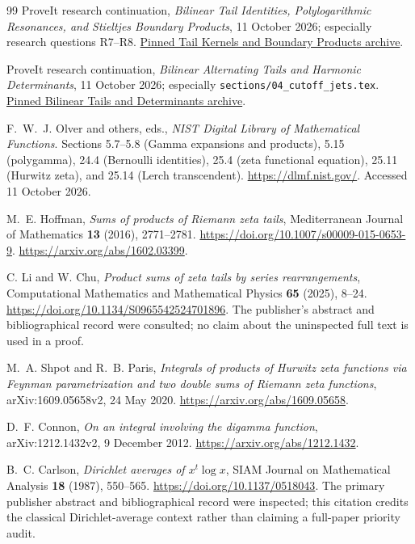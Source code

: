 \documentclass[11pt,letterpaper]{article}
\numberwithin{equation}{section}
\theoremstyle{definition}
\theoremstyle{remark}
\begin{document}
\begin{thebibliography}{99}
ProveIt research continuation,
\emph{Bilinear Tail Identities, Polylogarithmic Resonances,
and Stieltjes Boundary Products},
11 October 2026; especially research questions R7--R8.
\href{https://github.com/VladimirReshetnikov/ProveIt/blob/36edefa8c531d9d6df8306ac51bcc317250f404c/docs/incoming/ProveIt_Tail_Kernels_and_Boundary_Products_2026-10-11.zip}{Pinned Tail Kernels and Boundary Products archive}.

ProveIt research continuation,
\emph{Bilinear Alternating Tails and Harmonic Determinants},
11 October 2026; especially
\texttt{sections/04\_cutoff\_jets.tex}.
\href{https://github.com/VladimirReshetnikov/ProveIt/blob/36edefa8c531d9d6df8306ac51bcc317250f404c/docs/incoming/ProveIt_Bilinear_Tails_and_Determinants_2026-10-11.zip}{Pinned Bilinear Tails and Determinants archive}.

F.~W.~J. Olver and others, eds.,
\emph{NIST Digital Library of Mathematical Functions}.
Sections 5.7--5.8 (Gamma expansions and products), 5.15 (polygamma),
24.4 (Bernoulli identities), 25.4 (zeta functional equation),
25.11 (Hurwitz zeta), and 25.14 (Lerch transcendent).
\url{https://dlmf.nist.gov/}.
Accessed 11 October 2026.

M.~E. Hoffman,
\emph{Sums of products of Riemann zeta tails},
Mediterranean Journal of Mathematics \textbf{13} (2016), 2771--2781.
\url{https://doi.org/10.1007/s00009-015-0653-9}.
\url{https://arxiv.org/abs/1602.03399}.

C. Li and W. Chu,
\emph{Product sums of zeta tails by series rearrangements},
Computational Mathematics and Mathematical Physics
\textbf{65} (2025), 8--24.
\url{https://doi.org/10.1134/S0965542524701896}.
The publisher's abstract and bibliographical record were consulted;
no claim about the uninspected full text is used in a proof.

M.~A. Shpot and R.~B. Paris,
\emph{Integrals of products of Hurwitz zeta functions via Feynman
parametrization and two double sums of Riemann zeta functions},
arXiv:1609.05658v2, 24 May 2020.
\url{https://arxiv.org/abs/1609.05658}.

D.~F. Connon,
\emph{On an integral involving the digamma function},
arXiv:1212.1432v2, 9 December 2012.
\url{https://arxiv.org/abs/1212.1432}.

B.~C. Carlson,
\emph{Dirichlet averages of \(x^t\log x\)},
SIAM Journal on Mathematical Analysis \textbf{18} (1987), 550--565.
\url{https://doi.org/10.1137/0518043}.
The primary publisher abstract and bibliographical record were
inspected; this citation credits the classical Dirichlet-average
context rather than claiming a full-paper priority audit.


\end{thebibliography}
\end{document}

